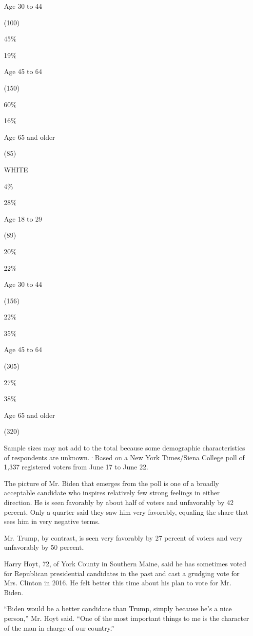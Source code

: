 Age 30 to 44

(100)

45\%

19\%

Age 45 to 64

(150)

60\%

16\%

Age 65 and older

(85)

WHITE

4\%

28\%

Age 18 to 29

(89)

20\%

22\%

Age 30 to 44

(156)

22\%

35\%

Age 45 to 64

(305)

27\%

38\%

Age 65 and older

(320)

Sample sizes may not add to the total because some demographic
characteristics of respondents are unknown.·Based on a New York
Times/Siena College poll of 1,337 registered voters from June 17 to June
22.

The picture of Mr. Biden that emerges from the poll is one of a broadly
acceptable candidate who inspires relatively few strong feelings in
either direction. He is seen favorably by about half of voters and
unfavorably by 42 percent. Only a quarter said they saw him very
favorably, equaling the share that sees him in very negative terms.

Mr. Trump, by contrast, is seen very favorably by 27 percent of voters
and very unfavorably by 50 percent.

Harry Hoyt, 72, of York County in Southern Maine, said he has sometimes
voted for Republican presidential candidates in the past and cast a
grudging vote for Mrs. Clinton in 2016. He felt better this time about
his plan to vote for Mr. Biden.

``Biden would be a better candidate than Trump, simply because he's a
nice person,'' Mr. Hoyt said. ``One of the most important things to me
is the character of the man in charge of our country.''

